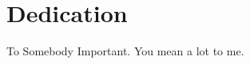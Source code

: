 \clearpage
\section*{\centering Dedication}

\vspace*{\fill}
\begin{center}
    To Somebody Important.
    You mean a lot to me.
\end{center}
\vspace*{\fill}